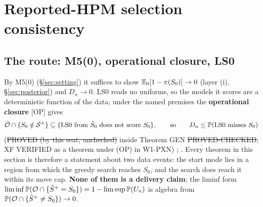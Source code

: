 \section{Reported-HPM selection consistency}\label{sec:hpm}

\subsection{The route: M5(0), operational closure, LS0}\label{sec:route}
By M5(0) (§\ref{sec:setting}) it suffices to show $\mathbb E_0[1-\pi(S_0)]\to0$ (layer (i), §\ref{sec:posterior}) and $D_n\to0$. LS0 reads no uniforms, so the models it scores are a deterministic function of the data; under the named premises the \textbf{operational closure} [OP] gives
\[
\bar{\mathcal O}\cap\{S_0\notin\bar{\mathcal S}^{+}\}\subseteq\{\text{LS0 from }\tilde{S}_0\text{ does not score }S_0\},\qquad\text{so}\qquad D_n\le\mathbb P(\text{LS0 misses }S_0)
\]
(\st{PROVED (by this seat, unchecked)} inside Theorem GEN \st{PROVED-CHECKED}; XF VERIFIED as a theorem under (OP) in W1-PXN) ; . Every theorem in this section is therefore a statement about two data events: the start mode lies in a region from which the greedy search reaches $S_0$, and the search does reach it within its move cap. \textbf{None of them is a delivery claim}; the liminf form $\liminf\mathbb P(\mathcal O\cap\{\hat S^{+}=S_0\})=1-\limsup\mathbb P(U_n)$ is algebra from $\mathbb P(\mathcal O\cap\{\hat S^{+}\ne S_0\})\to0$.

